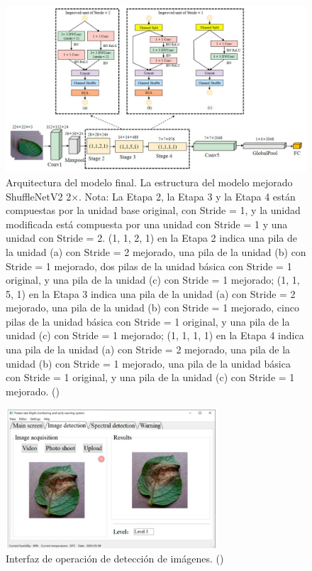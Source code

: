 \begin{figure}[h]						
	\begin{center}
		\includegraphics[width=1\textwidth]{2/figures/ant2.3.jpeg}
		\caption{Arquitectura del modelo final. 
			La estructura del modelo mejorado ShuffleNetV2 2×. Nota: La Etapa 2, la Etapa 3 y la Etapa 4 están compuestas por la unidad base original, con Stride = 1, y la unidad modificada está compuesta por una unidad con Stride = 1 y una unidad con Stride = 2. (1, 1, 2, 1) en la Etapa 2 indica una pila de la unidad (a) con Stride = 2 mejorado, una pila de la unidad (b) con Stride = 1 mejorado, dos pilas de la unidad básica con Stride = 1 original, y una pila de la unidad (c) con Stride = 1 mejorado; (1, 1, 5, 1) en la Etapa 3 indica una pila de la unidad (a) con Stride = 2 mejorado, una pila de la unidad (b) con Stride = 1 mejorado, cinco pilas de la unidad básica con Stride = 1 original, y una pila de la unidad (c) con Stride = 1 mejorado; (1, 1, 1, 1) en la Etapa 4 indica una pila de la unidad (a) con Stride = 2 mejorado, una pila de la unidad (b) con Stride = 1 mejorado, una pila de la unidad básica con Stride = 1 original, y una pila de la unidad (c) con Stride = 1 mejorado. (\cite{antecedente2})}
	\end{center}
\end{figure}
\begin{figure}[H]
	\begin{center}
		\includegraphics[width=0.7\textwidth]{2/figures/ant2.4.jpeg}
		\caption{Interfaz de operación de detección de imágenes. (\cite{antecedente2})}
	\end{center}
\end{figure}


